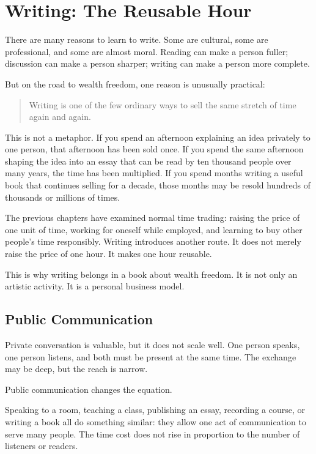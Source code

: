 \chapter{Writing: The Reusable Hour}

There are many reasons to learn to write. Some are cultural, some are professional, and some are almost moral. Reading can make a person fuller; discussion can make a person sharper; writing can make a person more complete.

But on the road to wealth freedom, one reason is unusually practical:

\begin{quote}
Writing is one of the few ordinary ways to sell the same stretch of time again and again.
\end{quote}

This is not a metaphor. If you spend an afternoon explaining an idea privately to one person, that afternoon has been sold once. If you spend the same afternoon shaping the idea into an essay that can be read by ten thousand people over many years, the time has been multiplied. If you spend months writing a useful book that continues selling for a decade, those months may be resold hundreds of thousands or millions of times.

The previous chapters have examined normal time trading: raising the price of one unit of time, working for oneself while employed, and learning to buy other people's time responsibly. Writing introduces another route. It does not merely raise the price of one hour. It makes one hour reusable.

This is why writing belongs in a book about wealth freedom. It is not only an artistic activity. It is a personal business model.

\section*{Public Communication}

Private conversation is valuable, but it does not scale well. One person speaks, one person listens, and both must be present at the same time. The exchange may be deep, but the reach is narrow.

Public communication changes the equation.

Speaking to a room, teaching a class, publishing an essay, recording a course, or writing a book all do something similar: they allow one act of communication to serve many people. The time cost does not rise in proportion to the number of listeners or readers.

